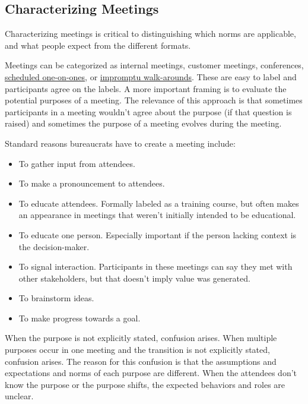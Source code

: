 \subsection*{Characterizing Meetings\label{sec:characterizing-meetings}}
Characterizing meetings is critical to distinguishing which norms are applicable, and what people expect from the different formats. 


Meetings can be categorized as internal meetings, customer meetings, conferences, \hyperref[sec:meetings-one-on-one]{scheduled one-on-ones}\iftoggle{haspagenumbers}{ (see page~\pageref{sec:meetings-one-on-one})}{}, or
\hyperref[sec:walk-arounds]{impromptu walk-arounds}\iftoggle{haspagenumbers}{ (see page~\pageref{sec:walk-arounds})}{}. These are easy to label and participants agree on the labels.
A more important framing is to evaluate the potential purposes of a meeting. The relevance of this approach is that sometimes participants in a meeting wouldn't agree about the purpose (if that question is raised) and sometimes the purpose of a meeting evolves during the meeting. 

Standard reasons bureaucrats have to create a meeting include:
\begin{itemize}
    \item To gather input from attendees.
    \item To make a pronouncement to attendees.
    \item To educate attendees. Formally labeled as a training course, but often makes an appearance in meetings that weren't initially intended to be educational. 
    \item To educate one person. Especially important if the person lacking context is the decision-maker. 
    \item To signal interaction. Participants in these meetings can say they met with other stakeholders, but that doesn't imply value was generated. 
    \item To brainstorm ideas.
    \item To make progress towards a goal.
\end{itemize}
When the purpose is not explicitly stated, confusion arises. 
When multiple purposes occur in one meeting and the transition is not explicitly stated, confusion arises.
The reason for this confusion is that the assumptions and expectations and norms of each purpose are different. When the attendees don't know the purpose or the purpose shifts, the expected behaviors and roles are unclear. 

